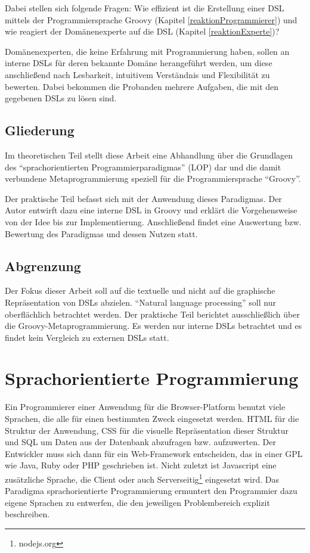 \documentclass[11pt,english,ngerman, headsepline]{scrreprt}
\begin{document}
Dabei stellen sich folgende Fragen: Wie effizient ist die Erstellung einer DSL
mittels der Programmiersprache Groovy (Kapitel \ref{reaktionProgrammierer}) und wie
reagiert der Domänenexperte auf die DSL (Kapitel \ref{reaktionExperte})?

Domänenexperten, die keine Erfahrung mit Programmierung haben, sollen an
interne DSLs für deren bekannte Domäne herangeführt werden, um diese
anschließend nach Lesbarkeit, intuitivem Verständnis und Flexibilität zu
bewerten. Dabei bekommen die Probanden mehrere Aufgaben, die mit den
gegebenen DSLs zu lösen sind. 
 
\section{Gliederung}

Im theoretischen Teil stellt diese Arbeit eine Abhandlung über die Grundlagen
des ``sprachorientierten Programmierparadigmas'' (LOP) dar und die
damit verbundene Metaprogrammierung speziell für die Programmiersprache ``Groovy''.

Der praktische Teil befasst sich mit der Anwendung dieses Paradigmas. Der Autor
entwirft dazu eine interne DSL in Groovy und erklärt die Vorgehensweise von der
Idee bis zur Implementierung.
Anschließend findet eine Auswertung bzw. Bewertung des Paradigmas und
dessen Nutzen statt.


\section{Abgrenzung}
Der Fokus dieser Arbeit soll auf die textuelle und nicht auf die graphische
Repräsentation von DSLs abzielen. “Natural language processing” soll nur
oberflächlich betrachtet werden. Der praktische Teil berichtet ausschließlich
über die Groovy-Metaprogrammierung. 
Es werden nur interne DSLs betrachtet und es findet kein Vergleich zu externen
DSLs statt.


\chapter{ Sprachorientierte Programmierung}

Ein Programmierer einer Anwendung für die Browser-Platform benutzt viele
Sprachen, die alle für einen bestimmten Zweck eingesetzt werden. HTML für die
Struktur der Anwendung, CSS für die visuelle Repräsentation dieser Struktur
und SQL um Daten aus der Datenbank abzufragen bzw. aufzuwerten. Der Entwickler muss sich dann für
ein Web-Framework entscheiden, das in einer GPL wie
Java, Ruby oder PHP geschrieben ist. Nicht zuletzt ist Javascript eine
zusätzliche Sprache, die Client oder auch Serverseitig\footnote{nodejs.org}
eingesetzt wird. 
Das Paradigma sprachorientierte Programmierung ermuntert den Programmier dazu
eigene Sprachen zu entwerfen, die den jeweiligen Problembereich explizit
beschreiben.
\end{document}
